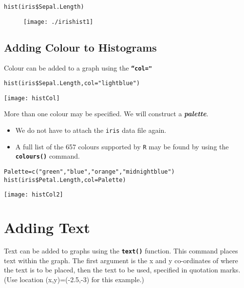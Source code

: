 \begin{framed}
\begin{verbatim}
hist(iris$Sepal.Length)

\end{verbatim}
\end{framed}
\begin{figure}[h!]
\centering
\texttt{[image: ./irishist1]}
\caption{}
\label{fig:irishist1}
\end{figure}

\subsection{Adding Colour to Histograms}
Colour can be added to a graph using the \textbf{\texttt{``col="}}
\begin{framed}
\begin{verbatim}
hist(iris$Sepal.Length,col="lightblue")
\end{verbatim}
\end{framed}
\begin{center}
\texttt{[image: histCol]}
\end{center}

More than one colour may be specified. We will construct a \textbf{\textit{palette}}.
\begin{itemize}
\item We do not have to attach the \texttt{iris} data file again.
\item A full list of the 657 colours supported by \texttt{R} may be found by using the \texttt{\textbf{colours()}} command. 
\end{itemize}

\begin{framed}
\begin{verbatim}
Palette=c("green","blue","orange","midnightblue")
hist(iris$Petal.Length,col=Palette)
\end{verbatim}
\end{framed}

\begin{center}
\texttt{[image: histCol2]}
\end{center}


\newpage
\section{Adding Text}

Text can be added to graphs using the \textbf{\texttt{text()}}  function. This command places text within the graph. The first argument is the x and y co-ordinates of where the text is to be placed, then the text to be used, specified in quotation marks.
(Use location (x,y)=(-2.5,-3) for this example.)


